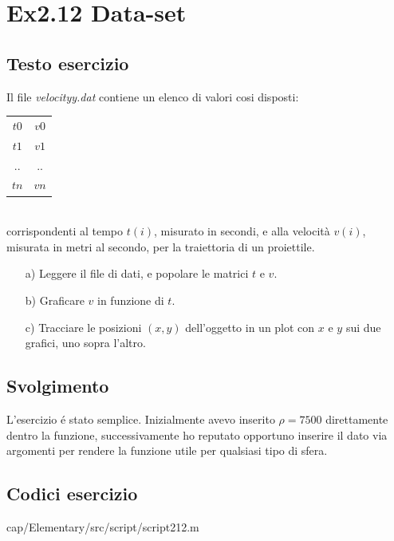 \section{Ex2.12 Data-set}\label{sec:Data_set}

\subsection{Testo esercizio}
Il file \textit{velocityy.dat} contiene un elenco di valori cosi disposti:\\

\begin{tabular}{cc}
    $t0$&$v0$\\
    $t1$&$v1$\\
    $..$&$..$\\
    $tn$&$vn$\\
\end{tabular}\\

corrispondenti al tempo $t(i)$, misurato in secondi, e alla velocità $v(i)$, 
misurata in metri al secondo, per la traiettoria di un proiettile.

\begin{itemize}
    \item[a)] Leggere il file di dati, e popolare le matrici $t$ e $v$.
    
    \item[b)] Graficare $v$ in funzione di $t$.
 
    \item[c)] Tracciare le posizioni $(x, y)$ dell'oggetto in un plot con $x$ e 
    $y$ sui due grafici, uno sopra l'altro.
\end{itemize}   

\subsection{Svolgimento}
L'esercizio \'e stato semplice. Inizialmente avevo inserito $\rho=7500$ 
direttamente dentro la funzione, successivamente ho reputato opportuno inserire 
il dato via argomenti per rendere la funzione utile per qualsiasi tipo di sfera.

\subsection{Codici esercizio}

{cap/Elementary/src/script/script212.m}
\pagebreak

